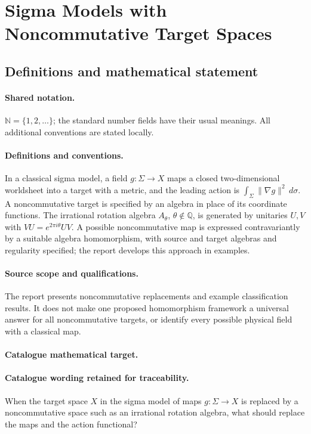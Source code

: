 \documentclass[11pt]{article}
\begin{document}
\section{Sigma Models with Noncommutative Target Spaces}\label{statement}

\subsection{Definitions and mathematical statement}

\paragraph{Shared notation.}$\mathbb N=\{1,2,\ldots\}$; the standard number fields have their usual meanings. All additional conventions are stated locally.


\paragraph{Definitions and conventions.} In a classical sigma model, a field $g:\Sigma\to X$ maps a closed two-dimensional worldsheet into a target with a metric, and the leading action is $\int_\Sigma\|\nabla g\|^2\,d\sigma$. A noncommutative target is specified by an algebra in place of its coordinate functions. The irrational rotation algebra $A_\theta$, $\theta\notin\mathbb Q$, is generated by unitaries $U,V$ with $VU=e^{2\pi i\theta}UV$. A possible noncommutative map is expressed contravariantly by a suitable algebra homomorphism, with source and target algebras and regularity specified; the report develops this approach in examples.

\paragraph{Source scope and qualifications.} The report presents noncommutative replacements and example classification results. It does not make one proposed homomorphism framework a universal answer for all noncommutative targets, or identify every possible physical field with a classical map.

\paragraph{Catalogue mathematical target.}
\paragraph{Catalogue wording retained for traceability.}
When the target space $X$ in the sigma model of maps $g:\Sigma\to X$ is replaced by a noncommutative space such as an irrational rotation algebra, what should replace the maps and the action functional?
\end{document}
